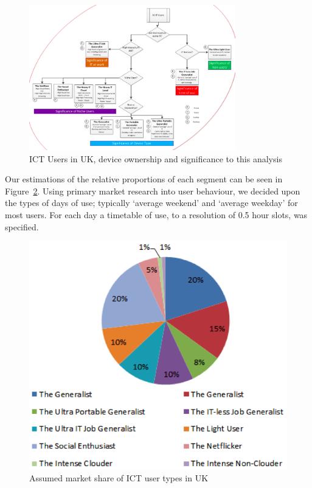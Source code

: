 \documentclass[conference]{IEEEtran}
\begin{document}
\begin{figure}
\centering
\includegraphics[width=0.8\textwidth]{images/ukitusers_ownership_signif.png}
\caption{ICT Users in UK, device ownership and significance to this analysis}
\label{fig:itusersuk} 
\end{figure}

Our estimations of the relative proportions of each segment can be
seen in Figure~\ref{fig:marketshare}.  Using primary market research
into user behaviour, we decided upon the types of days of use;
typically `average weekend' and `average weekday' for most users. For
each day a timetable of use, to a resolution of 0.5 hour slots, was
specified.

\begin{figure}
\centering
\includegraphics[width=0.9\columnwidth]{images/ukitusers_marketshare.png}
\caption{Assumed market share of ICT user types in UK}
\label{fig:marketshare} 
\end{figure}
\end{document}
